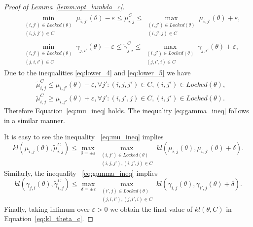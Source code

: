 \documentclass{article}
\begin{document}
\begin{proof}[Proof of Lemma~\ref{lemm:opt_lambda_c}]
\begin{align}
    & \min_{\substack{(i,j')\in Locked(\theta)\\(i, j, j') \in C}} \mu_{i,j'}(\theta) -\varepsilon \leq \tilde{\mu}^C_{i,j}  \leq   \max_{\substack{(i,j')\in Locked(\theta)\\(i, j', j) \in C}} \mu_{i,j'}(\theta) + \varepsilon,\label{eq:mu_ineq}\\
    &\min_{\substack{(i,j')\in Locked(\theta)\\(j, i, i') \in C}} \gamma_{j,i'}(\theta) -\varepsilon \leq \tilde{\gamma}^C_{j,i} \leq \max_{\substack{(i,j')\in Locked(\theta)\\(j, i', i) \in C}} \gamma_{j,i'}(\theta) + \varepsilon,\label{eq:gamma_ineq}
\end{align}
Due to the inequalities \eqref{eq:lower_4} and \eqref{eq:lower_5} we have 
\begin{align*}
&\tilde{\mu}^C_{i,j} \leq \mu_{i,j'}(\theta) -\varepsilon, \forall j': (i, j, j') \in C, (i,j') \in Locked(\theta), \\
&\tilde{\mu}^C_{i,j} \geq \mu_{i,j'}(\theta) + \varepsilon, \forall j': (i, j', j) \in C,  (i,j') \in Locked(\theta).
\end{align*}
Therefore Equation~\eqref{eq:mu_ineq} holds. The inequality \eqref{eq:gamma_ineq} follows in a similar manner.

It is easy to see  the inequality ~\eqref{eq:mu_ineq} implies 
$$
kl(\mu_{i,j}(\theta), \tilde{\mu}^C_{i,j}) \leq \max_{\delta = \pm\varepsilon}\max_{\substack{(i,j')\in Locked(\theta)\\ (i,j,j'), (i, j', j)\in C}} kl(\mu_{i,j}(\theta), \mu_{i,j'}(\theta) + \delta).
$$
Similarly, the inequality ~\eqref{eq:gamma_ineq} implies
$$
kl(\gamma_{j,i}(\theta), \tilde{\gamma}^C_{i,j}) \leq \max_{\delta = \pm\varepsilon}\max_{\substack{(i',j)\in Locked(\theta)\\(j,i,i'), (j, i', i)\in C}} kl(\gamma_{i,j}(\theta), \gamma_{i',j}(\theta) + \delta).
$$
Finally, taking infimum over $\varepsilon>0$ we obtain the final value of $kl(\theta, C)$ in Equation~\ref{eq:kl_theta_c}.
\end{proof}
\end{document}
